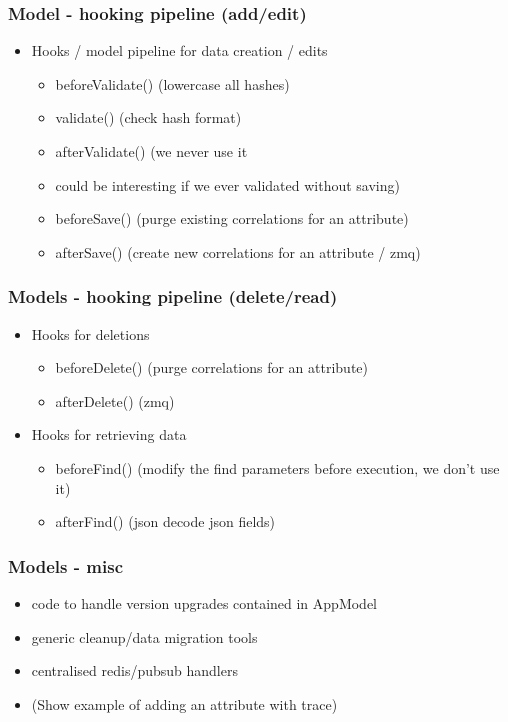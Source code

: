 \begin{frame}
\frametitle{Model - hooking pipeline (add/edit)}
  \begin{itemize}
  \item Hooks / model pipeline for data creation / edits
    \begin{itemize}
      \item beforeValidate() (lowercase all hashes)
      \item validate() (check hash format)
      \item afterValidate() (we never use it   \item could be interesting if we ever validated without saving)
      \item beforeSave() (purge existing correlations for an attribute)
      \item afterSave() (create new correlations for an attribute / zmq)
    \end{itemize}
  \end{itemize}
\end{frame}

\begin{frame}
  \frametitle{Models - hooking pipeline (delete/read)}
  \begin{itemize}
    \item Hooks for deletions
    \begin{itemize}
      \item beforeDelete() (purge correlations for an attribute)
      \item afterDelete() (zmq)
    \end{itemize}
    \item Hooks for retrieving data
    \begin{itemize}
      \item beforeFind() (modify the find parameters before execution, we don't use it)
      \item afterFind() (json decode json fields)
      \end{itemize}
    \end{itemize}
  \end{frame}

\begin{frame}
  \frametitle{Models - misc}
  \begin{itemize}
    \item code to handle version upgrades contained in AppModel
    \item generic cleanup/data migration tools
    \item centralised redis/pubsub handlers
    \item (Show example of adding an attribute with trace)
  \end{itemize}
\end{frame}

